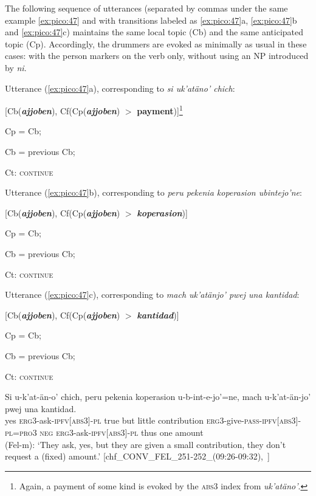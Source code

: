 \documentclass[output=paper
,modfonts
,nonflat]{langsci/langscibook}
\begin{document}
The following sequence of utterances (separated by commas under the same example \ref{ex:pico:47} and with transitions labeled as \ref{ex:pico:47}a, \ref{ex:pico:47}b and \ref{ex:pico:47}c) maintains the same local topic (Cb) and the same anticipated topic (Cp). Accordingly, the drummers are evoked as minimally as usual in these cases: with the person markers on the verb only, without using an NP introduced by \textit{ni}. 

\ea
\ea
Utterance (\ref{ex:pico:47}a), corresponding to \textit{si uk'atäno' chich}:

[Cb(\textbf{\textit{ajjoben}}),  Cf(Cp(\textbf{\textit{ajjoben}}) $>$ \textbf{payment})]\footnote{Again, a payment of some kind is evoked by the \textsc{abs3} index from \textit{uk'atäno'}.}

Cp = Cb;

Cb = previous Cb;

Ct: \textsc{continue}

\ex
Utterance (\ref{ex:pico:47}b), corresponding to \textit{peru pekenia koperasion ubintejo'ne}:

[Cb(\textbf{\textit{ajjoben}}),  Cf(Cp(\textbf{\textit{ajjoben}}) $>$ \textbf{\textit{koperasion}})]

Cp = Cb;

Cb = previous Cb;

Ct: \textsc{continue}

\ex
Utterance (\ref{ex:pico:47}c), corresponding to \textit{mach uk'atänjo' pwej una kantidad}:

[Cb(\textbf{\textit{ajjoben}}), Cf(Cp(\textbf{\textit{ajjoben}}) $>$ \textbf{\textit{kantidad}})]

Cp = Cb;

Cb = previous Cb;

Ct: \textsc{continue}
\z
\z

\ea{}
\label{ex:pico:47}

\gll Si u-k'at-än-o' chich, peru pekenia koperasion u-b-int-e-jo'=ne, mach u-k'at-\"an-jo' pwej una kantidad.
\\
yes \textsc{erg3}-ask-{\textsc{ipfv[abs3]}}-\textsc{pl} true but little contribution \textsc{erg3}-give-\textsc{pass}-{\textsc{ipfv[abs3]}}-\textsc{pl}=\textsc{pro3} {\textsc{neg}} \textsc{erg3}-ask-{\textsc{ipfv[abs3]}}-\textsc{pl} thus one amount\\
\glt (Fel-m): `They ask, yes, but they are given a small contribution, they don't request a (fixed) amount.' [chf\_CONV\_FEL\_251-252\_(09:26-09:32),~\citealt{Delgado-Galvan2018archive}]
\z
\end{document}
